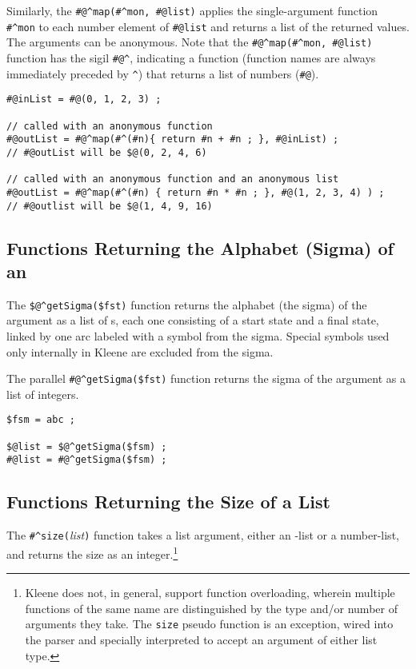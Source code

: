 Similarly, the 
\verb!#@^map(#^mon, #@list)!  applies the single-argument 
function \verb!#^mon! to each number
element of \verb!#@list! and returns a list of the returned values.  The
arguments can be anonymous.  Note that the \verb!#@^map(#^mon, #@list)! function has the sigil
\verb!#@^!, indicating a function (function names are always immediately preceded by
\verb!^!) that returns a list of numbers (\verb!#@!).

\begin{Verbatim}
#@inList = #@(0, 1, 2, 3) ;

// called with an anonymous function
#@outList = #@^map(#^(#n){ return #n + #n ; }, #@inList) ;
// #@outList will be $@(0, 2, 4, 6)

// called with an anonymous function and an anonymous list
#@outList = #@^map(#^(#n) { return #n * #n ; }, #@(1, 2, 3, 4) ) ;
// #@outlist will be $@(1, 4, 9, 16)
\end{Verbatim}

\subsection{Functions Returning the Alphabet (Sigma) of an \fsm{}}

The \verb+$@^getSigma($fst)+ function returns the alphabet (the sigma) of the argument
\fsm{} as a list of \fsm{}s, each one consisting of a start state and a final
state, linked by one arc labeled with a symbol from the sigma.  Special symbols
used only internally in Kleene are excluded from the sigma.

The parallel \verb+#@^getSigma($fst)+ function returns the sigma of the argument
\fsm{} as a list of integers.

\begin{Verbatim}
$fsm = abc ;

$@list = $@^getSigma($fsm) ;
#@list = #@^getSigma($fsm) ;
\end{Verbatim}

\subsection{Functions Returning the Size of a List}

The \verb+#^size(+\textit{list}\verb!)! function takes a list argument,
either an \fsm{}-list or a number-list, and returns the
size as an integer.\footnote{Kleene does not, in general, support function
overloading, wherein multiple functions of the same name are distinguished
by the type and/or number of arguments they take.
The \texttt{size} pseudo function is an exception,
wired into the parser and specially interpreted to accept an argument of either list
type.}

